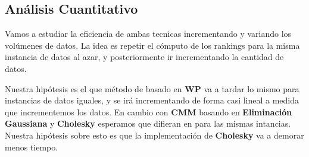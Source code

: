 \subsection{Análisis Cuantitativo}


Vamos a estudiar la eficiencia de ambas tecnicas incrementando y variando los volúmenes de datos. La idea es repetir el cómputo de los rankings para la misma instancia de datos al azar, y posteriormente ir incrementando la cantidad de datos.

Nuestra hipótesis es el que método de basado en \textbf{WP} va a tardar lo mismo para instancias de datos iguales, y se irá incrementando de forma casi lineal a medida que incrementemos los datos. En cambio con \textbf{CMM} basando en \textbf{Eliminación Gaussiana} y \textbf{Cholesky} esperamos que difieran en para las mismas intancias. Nuestra hipótesis sobre esto es que la implementación de \textbf{Cholesky} va a demorar menos tiempo.


 




